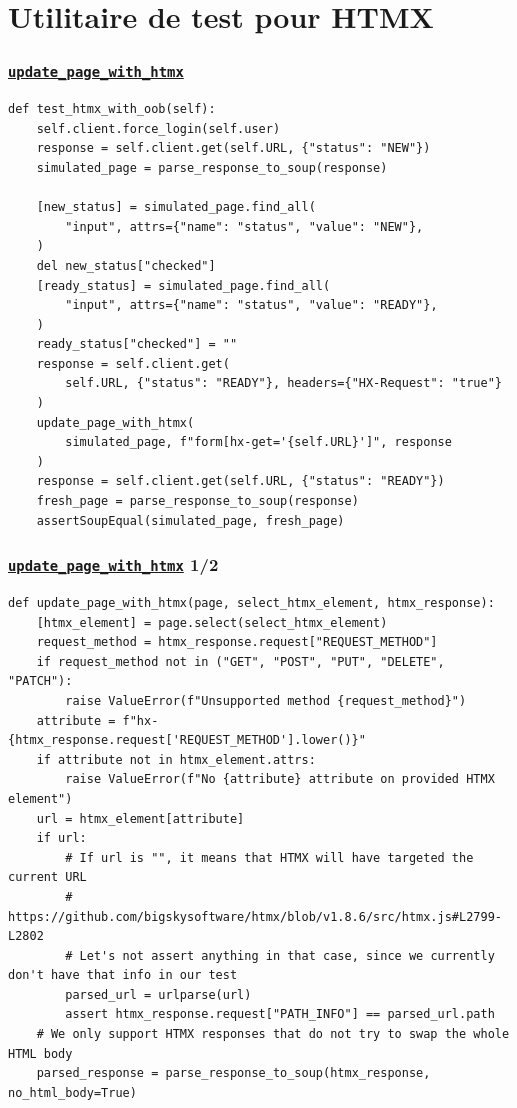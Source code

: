\documentclass{beamer}
\begin{document}
\section{Utilitaire de test pour HTMX}

\begin{frame}[fragile]
    \frametitle{\href{https://github.com/gip-inclusion/les-emplois/blob/9d800e6b3c8a814f17303157966830a0411db8e5/tests/utils/htmx/test.py\#L64}{\texttt{update\_page\_with\_htmx}}}
    \vspace{-0.3cm}
    \begin{verbatim}
def test_htmx_with_oob(self):
    self.client.force_login(self.user)
    response = self.client.get(self.URL, {"status": "NEW"})
    simulated_page = parse_response_to_soup(response)

    [new_status] = simulated_page.find_all(
        "input", attrs={"name": "status", "value": "NEW"},
    )
    del new_status["checked"]
    [ready_status] = simulated_page.find_all(
        "input", attrs={"name": "status", "value": "READY"},
    )
    ready_status["checked"] = ""
    response = self.client.get(
        self.URL, {"status": "READY"}, headers={"HX-Request": "true"}
    )
    update_page_with_htmx(
        simulated_page, f"form[hx-get='{self.URL}']", response
    )
    response = self.client.get(self.URL, {"status": "READY"})
    fresh_page = parse_response_to_soup(response)
    assertSoupEqual(simulated_page, fresh_page)
    \end{verbatim}
\end{frame}

\begin{frame}[fragile]
    \frametitle{\href{https://github.com/gip-inclusion/les-emplois/blob/9d800e6b3c8a814f17303157966830a0411db8e5/tests/utils/htmx/test.py\#L64}{\texttt{update\_page\_with\_htmx}} \hfill 1/2}
    \begin{verbatim}
def update_page_with_htmx(page, select_htmx_element, htmx_response):
    [htmx_element] = page.select(select_htmx_element)
    request_method = htmx_response.request["REQUEST_METHOD"]
    if request_method not in ("GET", "POST", "PUT", "DELETE", "PATCH"):
        raise ValueError(f"Unsupported method {request_method}")
    attribute = f"hx-{htmx_response.request['REQUEST_METHOD'].lower()}"
    if attribute not in htmx_element.attrs:
        raise ValueError(f"No {attribute} attribute on provided HTMX element")
    url = htmx_element[attribute]
    if url:
        # If url is "", it means that HTMX will have targeted the current URL
        # https://github.com/bigskysoftware/htmx/blob/v1.8.6/src/htmx.js#L2799-L2802
        # Let's not assert anything in that case, since we currently don't have that info in our test
        parsed_url = urlparse(url)
        assert htmx_response.request["PATH_INFO"] == parsed_url.path
    # We only support HTMX responses that do not try to swap the whole HTML body
    parsed_response = parse_response_to_soup(htmx_response, no_html_body=True)
    \end{verbatim}
\end{frame}
\end{document}
